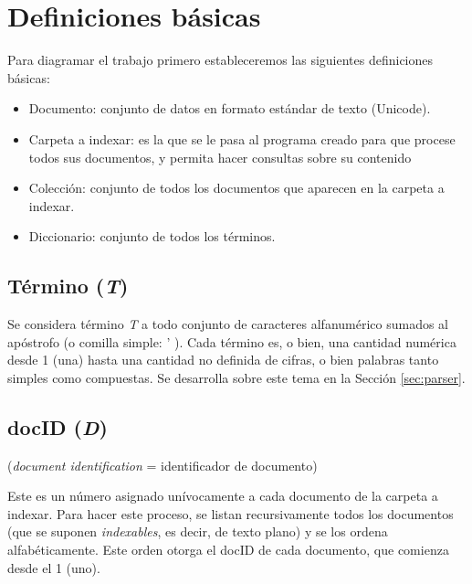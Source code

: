 \section{Definiciones básicas}

Para diagramar el trabajo primero estableceremos las siguientes definiciones básicas:
\begin{itemize}


\item Documento: conjunto de datos en formato estándar de texto (Unicode).

\item Carpeta a indexar: es la que se le pasa al programa creado para que procese todos sus documentos, y permita hacer consultas sobre su contenido

\item Colección: conjunto de todos los documentos que aparecen en la carpeta a indexar.

\item Diccionario: conjunto de todos los términos.

\end{itemize}


\subsection{Término (\textnormal{\itshape T})}

 
Se considera término \textit{T} a todo conjunto de caracteres alfanumérico sumados al apóstrofo (o comilla simple: ' ). Cada término es, o bien, una cantidad numérica desde 1 (una) hasta una cantidad no definida de cifras, o bien palabras tanto simples como compuestas. Se desarrolla sobre este tema en la Sección \ref{sec:parser}.


\subsection{docID (\textnormal{\itshape D})}
\noindent (\textit{document identification} = identificador de documento)

Este es un número asignado unívocamente a cada documento de la carpeta a indexar. Para hacer este proceso, se listan recursivamente todos los documentos (que se suponen \textit{indexables}, es decir, de texto plano) y se los ordena alfabéticamente. Este orden otorga el docID de cada documento, que comienza desde el 1 (uno).


